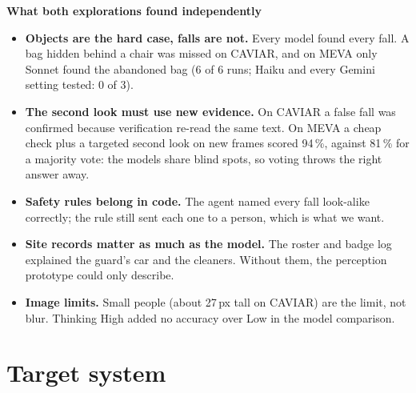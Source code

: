 \documentclass[11pt,a4paper]{article}
\begin{document}
\textbf{What both explorations found independently}
\begin{itemize}
\item \textbf{Objects are the hard case, falls are not.} Every model found every fall. A bag hidden behind a
chair was missed on CAVIAR, and on MEVA only Sonnet found the abandoned bag (6 of 6 runs; Haiku and every Gemini
setting tested: 0 of 3).
\item \textbf{The second look must use new evidence.} On CAVIAR a false fall was confirmed because verification
re-read the same text. On MEVA a cheap check plus a targeted second look on new frames scored 94\,\%, against
81\,\% for a majority vote: the models share blind spots, so voting throws the right answer away.
\item \textbf{Safety rules belong in code.} The agent named every fall look-alike correctly; the rule still sent
each one to a person, which is what we want.
\item \textbf{Site records matter as much as the model.} The roster and badge log explained the guard's car and
the cleaners. Without them, the perception prototype could only describe.
\item \textbf{Image limits.} Small people (about 27\,px tall on CAVIAR) are the limit, not blur. Thinking High
added no accuracy over Low in the model comparison.
\end{itemize}

\section{Target system}
\end{document}
